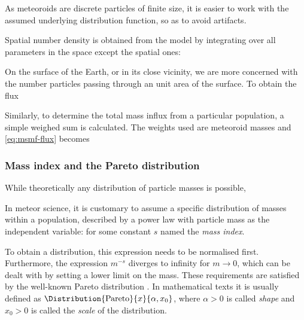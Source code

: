             As meteoroids are discrete particles of finite size, it is easier to work with the
            assumed underlying distribution function, so as to avoid artifacts.

            Spatial number density is obtained from the model by integrating over all parameters
            in the space except the spatial ones:

            On the surface of the Earth, or in its close vicinity, we are more concerned with
            the number particles passing through an unit area of the surface.
            To obtain the flux

            Similarly, to determine the total mass influx from a particular population, a simple weighed sum is calculated.
            The weights used are meteoroid masses and \cref{eq:msmf-flux} becomes

        \subsubsection{Mass index and the Pareto distribution} \label{msms}
            While theoretically any distribution of particle masses is possible,

            In meteor science, it is customary to assume a specific distribution of masses within a population,
            described by a power law with particle mass as the independent variable:
            for some constant $s$ named the \emph{mass index}.

            To obtain a distribution, this expression needs to be normalised first.
            Furthermore, the expression $m^{-s}$ diverges to infinity for $m \to 0$,
            which can be dealt with by setting a lower limit on the mass.
            These requirements are satisfied by the well-known Pareto distribution \citep{arnold1983}.
            In mathematical texts it is usually defined as $\Distribution{\mathrm{Pareto}}{x}{\alpha, x_0}$,
            where $\alpha > 0$ is called \emph{shape} and $x_0 > 0$ is called the \emph{scale} of the distribution.

